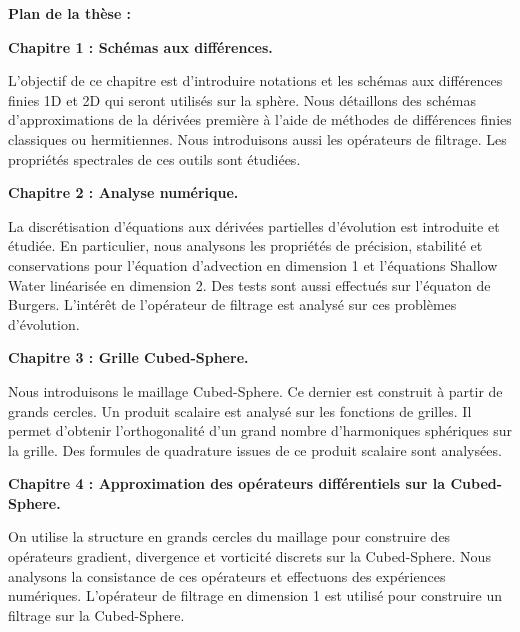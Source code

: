 \vspace{1.3cm}
\textbf{Plan de la thèse :}

\textbf{Chapitre 1 : Schémas aux différences.}

L'objectif de ce chapitre est d'introduire notations et les schémas aux différences finies 1D et 2D qui seront utilisés sur la sphère. Nous détaillons des schémas d'approximations de la dérivées première à l'aide de méthodes de différences finies classiques ou hermitiennes. Nous introduisons aussi les opérateurs de filtrage. Les propriétés spectrales de ces outils sont étudiées.







\vspace{0.7cm}
\textbf{Chapitre 2 : Analyse numérique.}

La discrétisation d'équations aux dérivées partielles d'évolution est introduite et étudiée. En particulier, nous analysons les propriétés de précision, stabilité et conservations pour l'équation d'advection en dimension 1 et l'équations Shallow Water linéarisée en dimension 2. Des tests sont aussi effectués sur l'équaton de Burgers. L'intérêt de l'opérateur de filtrage est analysé sur ces problèmes d'évolution.







\vspace{0.7cm}
\textbf{Chapitre 3 : Grille Cubed-Sphere.}

Nous introduisons le maillage Cubed-Sphere. Ce dernier est construit à partir de grands cercles. Un produit scalaire est analysé sur les fonctions de grilles. Il permet d'obtenir l'orthogonalité d'un grand nombre d'harmoniques sphériques sur la grille. Des formules de quadrature issues de ce produit scalaire sont analysées.






\vspace{0.7cm}
\textbf{Chapitre 4 : Approximation des opérateurs différentiels sur la Cubed-Sphere.}

On utilise la structure en grands cercles du maillage pour construire des opérateurs gradient, divergence et vorticité discrets sur la Cubed-Sphere. Nous analysons la consistance de ces opérateurs et effectuons des expériences numériques. L'opérateur de filtrage en dimension 1 est utilisé pour construire un filtrage sur la Cubed-Sphere.








